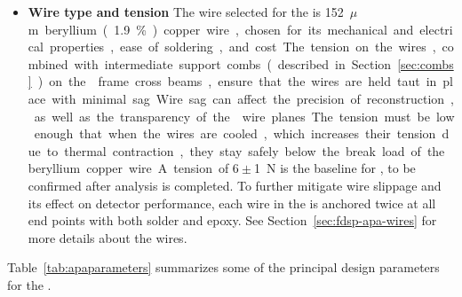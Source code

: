 \begin{itemize}
\item \textbf{Wire type and tension}  The wire selected for the  is \SI{152}{$\mu$m} beryllium (\num{1.9}\%) copper wire, %
chosen for its mechanical and electrical properties, ease of soldering, and cost.  The tension on the wires, combined with intermediate support combs (described in Section~\ref{sec:combs}) on the  frame cross beams, ensure that the wires are held taut in place with minimal sag.  Wire sag can affect the precision of reconstruction, as well as the transparency of the  wire planes.  The tension must be low enough that when the wires are cooled, which increases their tension due to thermal contraction, they stay safely below the break load of the beryllium copper wire.  A tension of $6\pm$\SI{1}{N} is the baseline for , to be confirmed after  analysis is completed.  To further mitigate wire slippage and its effect on detector performance, each wire in the  is anchored twice at all end points with both solder and epoxy.  See Section~\ref{sec:fdsp-apa-wires} for more details about the wires.

\end{itemize}

Table~\ref{tab:apaparameters} summarizes some of the principal design parameters for the  
.

